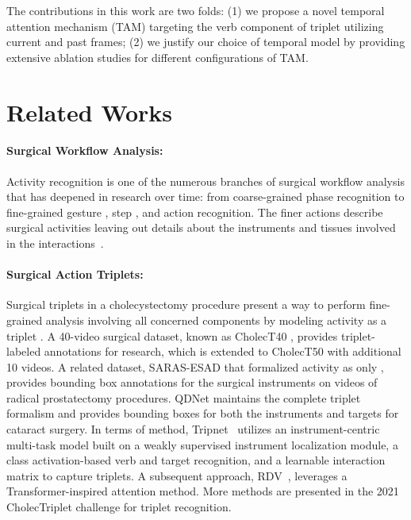 \documentclass{article}
\begin{document}
The contributions in this work are two folds: (1) we propose a novel temporal attention mechanism (TAM) targeting the verb component of triplet utilizing current and past frames; (2) we justify our choice of temporal model by providing extensive ablation studies for different configurations of TAM.


\section{Related Works}
\paragraph{\textbf{Surgical Workflow Analysis:}}
Activity recognition is one of the numerous branches of surgical workflow analysis that has deepened in research over time: from coarse-grained phase recognition \cite{dergaseg,funkessltempo,transvnet} to fine-grained gesture \cite{dipietrokinematics}, step \cite{sanatmtl}, and action \cite{wagner2021comparative} recognition.
The finer actions describe surgical activities leaving out details about the instruments and tissues involved in the interactions~\cite{nwoye2021deep}.

\paragraph{\textbf{Surgical Action Triplets:}} 
Surgical triplets in a cholecystectomy procedure present a way to perform fine-grained analysis involving all concerned components by modeling activity as a triplet \textrangle{}. 
A 40-video surgical dataset, known as CholecT40 \cite{tripnet}, provides triplet-labeled annotations for research, which is extended to CholecT50 \cite{rdv} with additional 10 videos. 
A related dataset, SARAS-ESAD \cite{bawa2021saras} that formalized activity as only \textrangle{}, provides bounding box annotations for the surgical instruments on  videos of radical prostatectomy procedures. 
QDNet \cite{lin2022instrument} maintains the complete triplet formalism and provides bounding boxes for both the instruments and targets for cataract surgery.
In terms of method, Tripnet~ \cite{tripnet} utilizes an instrument-centric multi-task model built on a weakly supervised instrument localization module, a class activation-based verb and target recognition, and a learnable interaction matrix to capture triplets. A subsequent approach, RDV~\cite{rdv}, leverages a Transformer-inspired attention method. 
More methods are presented in the 2021 CholecTriplet challenge \cite{ct50challenge2021} for triplet recognition.
\end{document}

